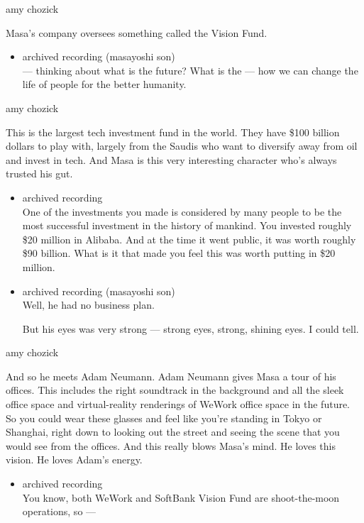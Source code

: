 amy chozick

Masa's company oversees something called the Vision Fund.

\begin{itemize}
\tightlist
\item
  archived recording (masayoshi son)\\
  --- thinking about what is the future? What is the --- how we can
  change the life of people for the better humanity.
\end{itemize}

amy chozick

This is the largest tech investment fund in the world. They have \$100
billion dollars to play with, largely from the Saudis who want to
diversify away from oil and invest in tech. And Masa is this very
interesting character who's always trusted his gut.

\begin{itemize}
\item
  archived recording\\
  One of the investments you made is considered by many people to be the
  most successful investment in the history of mankind. You invested
  roughly \$20 million in Alibaba. And at the time it went public, it
  was worth roughly \$90 billion. What is it that made you feel this was
  worth putting in \$20 million.
\item
  archived recording (masayoshi son)\\
  Well, he had no business plan.

  But his eyes was very strong --- strong eyes, strong, shining eyes. I
  could tell.
\end{itemize}

amy chozick

And so he meets Adam Neumann. Adam Neumann gives Masa a tour of his
offices. This includes the right soundtrack in the background and all
the sleek office space and virtual-reality renderings of WeWork office
space in the future. So you could wear these glasses and feel like
you're standing in Tokyo or Shanghai, right down to looking out the
street and seeing the scene that you would see from the offices. And
this really blows Masa's mind. He loves this vision. He loves Adam's
energy.

\begin{itemize}
\tightlist
\item
  archived recording\\
  You know, both WeWork and SoftBank Vision Fund are shoot-the-moon
  operations, so ---
\end{itemize}

